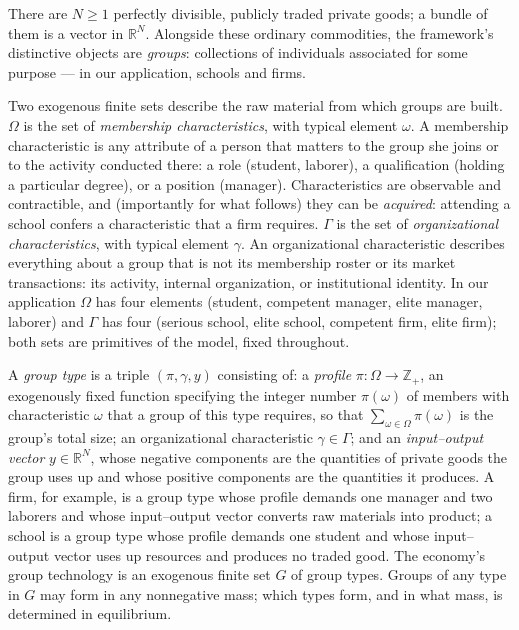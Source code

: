 \documentclass[12pt,letterpaper]{article}
\theoremstyle{definition}
\newcommand{\R}{\mathbb{R}}
\begin{document}
There are $N\geq 1$ perfectly divisible, publicly traded private goods; a bundle of them is a vector in $\R^N$.
Alongside these ordinary commodities, the framework's distinctive objects are \emph{groups}: collections of individuals associated for some purpose --- in our application, schools and firms.

Two exogenous finite sets describe the raw material from which groups are built.
$\Omega$ is the set of \emph{membership characteristics}, with typical element $\omega$.
A membership characteristic is any attribute of a person that matters to the group she joins or to the activity conducted there: a role (student, laborer), a qualification (holding a particular degree), or a position (manager).
Characteristics are observable and contractible, and (importantly for what follows) they can be \emph{acquired}: attending a school confers a characteristic that a firm requires.
$\Gamma$ is the set of \emph{organizational characteristics}, with typical element $\gamma$.
An organizational characteristic describes everything about a group that is not its membership roster or its market transactions: its activity, internal organization, or institutional identity.
In our application $\Omega$ has four elements (student, competent manager, elite manager, laborer) and $\Gamma$ has four (serious school, elite school, competent firm, elite firm); both sets are primitives of the model, fixed throughout.

A \emph{group type} is a triple $(\pi,\gamma,y)$ consisting of:
a \emph{profile} $\pi:\Omega\rightarrow\mathbb{Z}_+$, an exogenously fixed function specifying the integer number $\pi(\omega)$ of members with characteristic $\omega$ that a group of this type requires, so that $\sum_{\omega\in\Omega}\pi(\omega)$ is the group's total size;
an organizational characteristic $\gamma\in\Gamma$;
and an \emph{input--output vector} $y\in\R^N$, whose negative components are the quantities of private goods the group uses up and whose positive components are the quantities it produces.
A firm, for example, is a group type whose profile demands one manager and two laborers and whose input--output vector converts raw materials into product; a school is a group type whose profile demands one student and whose input--output vector uses up resources and produces no traded good.
The economy's group technology is an exogenous finite set $G$ of group types.
Groups of any type in $G$ may form in any nonnegative mass; which types form, and in what mass, is determined in equilibrium.
\end{document}
